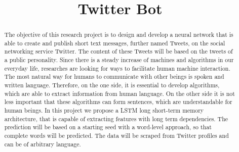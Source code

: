 \documentclass[conference]{IEEEtran}
\begin{document}
\title{Twitter Bot}

\author{
\and
{}
\and
{}
}

\maketitle

\begin{abstract}
The objective of this research project is to design and develop a neural network that is able to create and publish short text messages, further named Tweets, on the social networking service Twitter. The content of these Tweets will be based on the tweets of a public personality. Since there is a steady increase of machines and algorithms in our everyday life, researches are looking for ways to facilitate human machine interaction. The most natural way for humans to communicate with other beings is spoken and written language. Therefore, on the one side, it is essential to develop algorithms, which are able to extract information from human language. On the other side it is not less important that these algorithms can form sentences, which are understandable for human beings. In this project we propose a LSTM long short-term memory architecture, that is capable of extracting features with long term dependencies. The prediction will be based on a  starting seed with a word-level approach, so that complete words will be predicted. The data will be scraped from Twitter profiles and can be of arbitrary language. 
\end{abstract}
\end{document}
